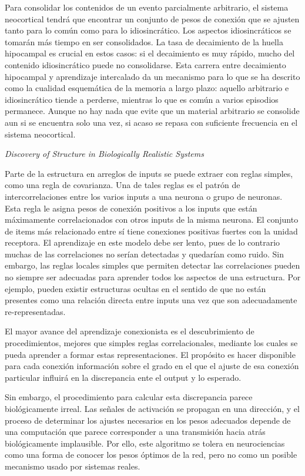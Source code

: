 \documentclass[a4paper,12pt]{article}
\begin{document}
Para consolidar los contenidos de un evento parcialmente arbitrario, el sistema neocortical tendrá que encontrar un conjunto de pesos de conexión que se ajusten tanto para lo común como para lo idiosincrático. Los aspectos idiosincráticos se tomarán más tiempo en ser consolidados. La tasa de decaimiento de la huella hipocampal es crucial en estos casos: si el decaimiento es muy rápido, mucho del contenido idiosincrático puede no consolidarse. Esta carrera entre decaimiento hipocampal y aprendizaje intercalado da un mecanismo para lo que se ha descrito como la cualidad esquemática de la memoria a largo plazo: aquello arbitrario e idiosincrático tiende a perderse, mientras lo que es común a varios episodios permanece. Aunque no hay nada que evite que un material arbitrario se consolide aun si se encuentra solo una vez, si acaso se repasa con suficiente frecuencia en el sistema neocortical.

{\itshape Discovery of Structure in Biologically Realistic Systems}

Parte de la estructura en arreglos de inputs se puede extraer con reglas simples, como una regla de covarianza. Una de tales reglas es el patrón de intercorrelaciones entre los varios inputs a una neurona o grupo de neuronas. Esta regla le asigna pesos de conexión positivos a los inputs que están máximamente correlacionados con otros inputs de la misma neurona. El conjunto de items más relacionado entre sí tiene conexiones positivas fuertes con la unidad receptora. El aprendizaje en este modelo debe ser lento, pues de lo contrario muchas de las correlaciones no serían detectadas y quedarían como ruido. Sin embargo, las reglas locales simples que permiten detectar las correlaciones pueden no siempre ser adecuadas para aprender todos los aspectos de una estructura. Por ejemplo, pueden existir estructuras ocultas en el sentido de que no están presentes como una relación directa entre inputs una vez que son adecuadamente re-representadas. 

El mayor avance del aprendizaje conexionista es el descubrimiento de procedimientos, mejores que simples reglas correlacionales, mediante los cuales se pueda aprender a formar estas representaciones. El propósito es hacer disponible para cada conexión información sobre el grado en el que el ajuste de esa conexión particular influirá en la discrepancia ente el output y lo esperado.

Sin embargo, el procedimiento para calcular esta discrepancia parece biológicamente irreal. Las señales de activación se propagan en una dirección, y el proceso de determinar los ajustes necesarios en los pesos adecuados depende de una computación que parece corresponder a una transmisión hacia atrás biológicamente implausible. Por ello, este algoritmo se tolera en neurociencias como una forma de conocer los pesos óptimos de la red, pero no como un posible mecanismo usado por sistemas reales.
\end{document}
